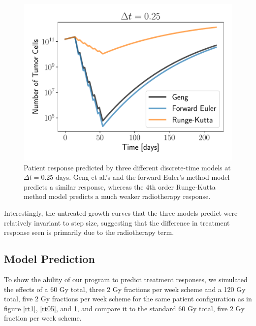 \documentclass[letterpaper
, superscriptaddress
, twocolumn
, aps
]{revtex4}
\begin{document}
\begin{figure}
	\includegraphics[width=1.00\columnwidth]{Figures/responsedt25.pdf}
	\caption{Patient response predicted by three different discrete-time models at $\Delta t = 0.25$ days. Geng et al.'s and the forward Euler's method model predicts a similar response, whereas the 4th order Runge-Kutta method model predicts a much weaker radiotherapy response.}
	\label{rt25}
\end{figure}

Interestingly, the untreated growth curves that the three models predict were relatively invariant to step size, suggesting that the difference in treatment response seen is primarily due to the radiotherapy term.

\subsection{Model Prediction}
To show the ability of our program to predict treatment responses, we simulated the effects of a 60 Gy total, three 2 Gy fractions per week scheme and a 120 Gy total, five 2 Gy fractions per week scheme for the same patient configuration as in figure \ref{rt1}, \ref{rt05}, and \ref{rt25}, and compare it to the standard 60 Gy total, five 2 Gy fraction per week scheme.
\end{document}
